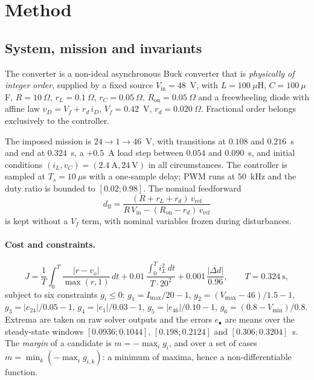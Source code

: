 \section{Method}
\label{sec:method}

\subsection{System, mission and invariants}

The converter is a non-ideal asynchronous Buck converter that is
\emph{physically of integer order}, supplied by a fixed source
$V_\mathrm{in}=48$~V, with $L=100~\mu$H, $C=100~\mu$F, $R=10~\Omega$,
$r_L=0.1~\Omega$, $r_C=0.05~\Omega$, $R_\mathrm{on}=0.05~\Omega$ and a
freewheeling diode with affine law $v_D=V_f+r_d\,i_D$, $V_f=0.42$~V,
$r_d=0.020~\Omega$. Fractional order belongs exclusively to the controller.

The imposed mission is $24\to1\to46$~V, with transitions at $0.108$ and
$0.216$~s and end at $0.324$~s, a $+0.5$~A load step between $0.054$ and
$0.090$~s, and initial conditions $(i_L,v_C)=(2.4~\mathrm{A},24~\mathrm{V})$
in all circumstances. The controller is sampled at $T_s=10~\mu$s with a
one-sample delay; PWM runs at $50$~kHz and the duty ratio is bounded to
$[0.02;0.98]$. The nominal feedforward
\begin{equation}
d_\mathrm{ff}=\frac{(R+r_L+r_d)\,v_\mathrm{ref}}{R\,V_\mathrm{in}-(R_\mathrm{on}-r_d)\,v_\mathrm{ref}}
\label{eq:dff}
\end{equation}
is kept without a $V_f$ term, with nominal variables frozen during
disturbances.

\paragraph{Cost and constraints.}
\begin{equation}
J=\frac{1}{T}\!\int_0^T\!\frac{|r-v_o|}{\max(r,1)}\,dt
+0.01\,\frac{\int_0^T i_L^2\,dt}{T\cdot 20^2}
+0.001\,\frac{\overline{|\Delta d|}}{0.96},\qquad T=0.324~\mathrm{s},
\end{equation}
subject to six constraints $g_i\le0$:
$g_1=I_\mathrm{max}/20-1$,
$g_2=(V_\mathrm{max}-46)/1.5-1$,
$g_3=|e_{24}|/0.05-1$,
$g_4=|e_{1}|/0.03-1$,
$g_5=|e_{46}|/0.10-1$,
$g_6=(0.8-V_\mathrm{min})/0.8$.
Extrema are taken on raw solver outputs and the errors $e_\bullet$ are means
over the steady-state windows $[0.0936;0.1044]$, $[0.198;0.2124]$ and
$[0.306;0.3204]$~s. The \emph{margin} of a candidate is $m=-\max_i g_i$, and
over a set of cases $m=\min_k(-\max_i g_{i,k})$: a minimum of maxima, hence a
non-differentiable function.


